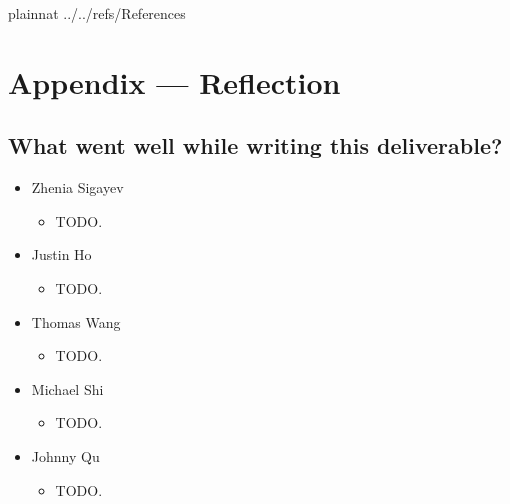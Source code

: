 \documentclass[12pt]{article}
\begin{document}



\newpage

 {plainnat}
 {../../refs/References}

\newpage

\section*{Appendix --- Reflection}

  \subsection{What went well while writing this deliverable?}
   \begin{itemize}
    \item Zhenia Sigayev
      \begin{itemize}[label=$\circ$]
        \item TODO.
      \end{itemize}
    \item Justin Ho
      \begin{itemize}[label=$\circ$]
        \item TODO.
      \end{itemize}
    \item Thomas Wang
      \begin{itemize}[label=$\circ$]
        \item TODO.
      \end{itemize}
    \item Michael Shi
      \begin{itemize}[label=$\circ$]
        \item TODO.
      \end{itemize}
    \item Johnny Qu
      \begin{itemize}[label=$\circ$]
        \item TODO.
      \end{itemize}
  \end{itemize}
\end{document}
